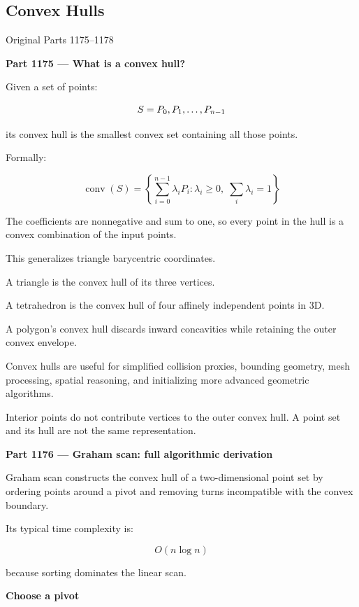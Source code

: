 \subsection{Convex Hulls}\label{04-visual-computing-ii-ch022-convex-hulls}

\hypertarget{04-visual-computing-ii-ch022-convex-hulls}{}

Original Parts 1175--1178

\textbf{Part 1175 --- What is a convex hull?}

Given a set of points:

\[
S=\\{P_0,P_1,\ldots,P_{n-1}\\}
\]

its convex hull is the smallest convex set containing all those points.

Formally:

\[
\boxed{ \operatorname{conv}(S)= \left\{ \sum_{i=0}^{n-1}\lambda_iP_i: \lambda_i\ge0,\; \sum_i\lambda_i=1 \right\} }
\]

The coefficients are nonnegative and sum to one, so every point in the hull is a convex combination of the input points.

This generalizes triangle barycentric coordinates.

A triangle is the convex hull of its three vertices.

A tetrahedron is the convex hull of four affinely independent points in 3D.

A polygon's convex hull discards inward concavities while retaining the outer convex envelope.

Convex hulls are useful for simplified collision proxies, bounding geometry, mesh processing, spatial reasoning, and initializing more advanced geometric algorithms.

Interior points do not contribute vertices to the outer convex hull. A point set and its hull are not the same representation.

\textbf{Part 1176 --- Graham scan: full algorithmic derivation}

Graham scan constructs the convex hull of a two-dimensional point set by ordering points around a pivot and removing turns incompatible with the convex boundary.

Its typical time complexity is:

\[
\boxed{O(n\log n)}
\]

because sorting dominates the linear scan.

\textbf{Choose a pivot}

